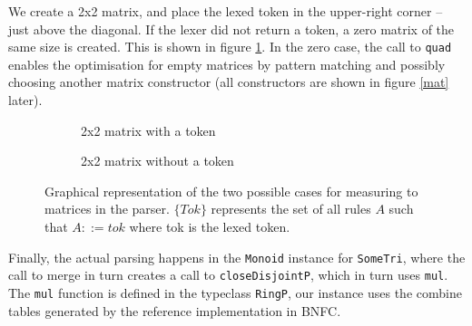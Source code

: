\documentclass[a4paper,12pt,twosided]{report}
\begin{document}
We create a 2x2 matrix, and place the lexed token in the upper-right corner
-- just above the diagonal. If the lexer did not return a token, a zero matrix
of the same size is created. This is shown in figure \ref{measurematrix}. In the
zero case, the call to \texttt{quad} enables the optimisation for empty matrices
by pattern matching and possibly choosing another matrix constructor (all
constructors are shown in figure \ref{mat} later).

\begin{figure}[H]
\begin{subfigure}[H]{.45\textwidth}
    \centering
\caption{2x2 matrix with a token}
\end{subfigure}
\hfill
\begin{subfigure}[H]{.45\textwidth}
    \centering
\caption{2x2 matrix without a token}
\end{subfigure}
\caption{\label{measurematrix} Graphical representation of the two possible
cases for measuring to matrices in the parser. $\{Tok\}$ represents the set of all
rules $A$ such that $A ::= tok$ where tok is the lexed token.}
\end{figure}

Finally, the actual parsing happens in the \texttt{Monoid} instance for
\texttt{SomeTri}, where the call to merge in turn creates a call to
\texttt{closeDisjointP}, which in turn uses \texttt{mul}. The \texttt{mul}
function is defined in the typeclass \texttt{RingP}, our instance uses the
combine tables generated by the reference implementation in BNFC.
\end{document}
